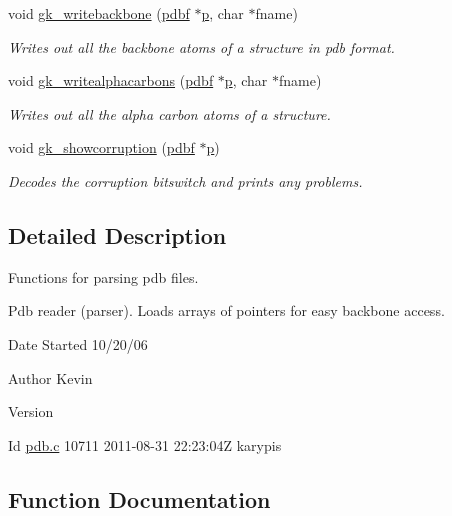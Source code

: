 \begin{DoxyCompactItemize}
void \hyperlink{a00125_a04817c574e29493f0363ef81b41f82df}{gk\+\_\+writebackbone} (\hyperlink{a00666}{pdbf} $\ast$\hyperlink{a00614_a1e0420801cd5156c14e085b87a4945f5}{p}, char $\ast$fname)
\begin{DoxyCompactList}\small\item\em Writes out all the backbone atoms of a structure in pdb format. \end{DoxyCompactList}\item 
void \hyperlink{a00125_ad0eef52d1d7e2da669accced22e821a4}{gk\+\_\+writealphacarbons} (\hyperlink{a00666}{pdbf} $\ast$\hyperlink{a00614_a1e0420801cd5156c14e085b87a4945f5}{p}, char $\ast$fname)
\begin{DoxyCompactList}\small\item\em Writes out all the alpha carbon atoms of a structure. \end{DoxyCompactList}\item 
void \hyperlink{a00125_ac07e046d84d58f44124e9b28e90d619c}{gk\+\_\+showcorruption} (\hyperlink{a00666}{pdbf} $\ast$\hyperlink{a00614_a1e0420801cd5156c14e085b87a4945f5}{p})
\begin{DoxyCompactList}\small\item\em Decodes the corruption bitswitch and prints any problems. \end{DoxyCompactList}\end{DoxyCompactItemize}


\subsection{Detailed Description}
Functions for parsing pdb files. 

Pdb reader (parser). Loads arrays of pointers for easy backbone access.

\begin{DoxyDate}{Date}
Started 10/20/06 
\end{DoxyDate}
\begin{DoxyAuthor}{Author}
Kevin 
\end{DoxyAuthor}
\begin{DoxyVersion}{Version}

\end{DoxyVersion}
\begin{DoxyParagraph}{Id}
\hyperlink{a00125}{pdb.\+c} 10711 2011-\/08-\/31 22\+:23\+:04Z karypis 
\end{DoxyParagraph}


\subsection{Function Documentation}
\mbox{\label{a00125_ab49542f55191276b91d65ad61a198ab2}} 
